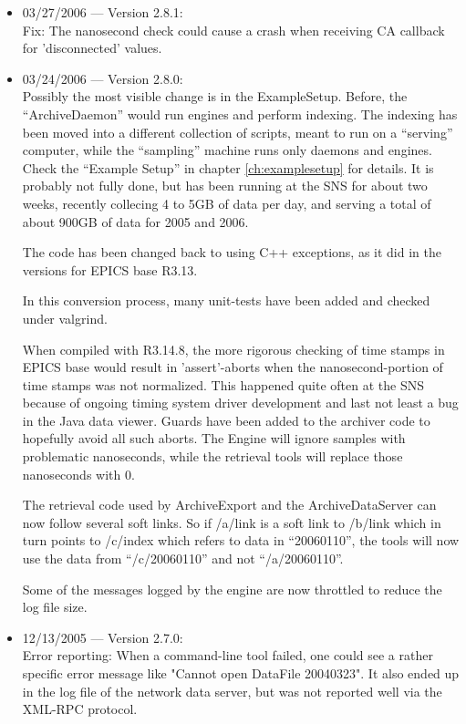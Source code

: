 \begin{itemize}
\item 03/27/2006 --- Version 2.8.1:\\
Fix: The nanosecond check could cause a crash when receiving
CA callback for 'disconnected' values.

\item 03/24/2006 --- Version 2.8.0:\\
Possibly the most visible change is in the ExampleSetup.
Before, the ``ArchiveDaemon'' would run engines and perform indexing.
The indexing has been moved into a different collection of scripts,
meant to run on a ``serving'' computer, while the ``sampling'' machine
runs only daemons and engines.
Check the ``Example Setup'' in chapter \ref{ch:examplesetup} for details.
It is probably not fully done, but has been running at the SNS for
about two weeks, recently collecing 4 to 5GB of data per day,
and serving a total of about 900GB of data for 2005 and 2006.

The code has been changed back to using C++ exceptions, as it did in
the versions for EPICS base R3.13.

In this conversion process, many unit-tests have been added
and checked under valgrind.

When compiled with R3.14.8, the more rigorous checking of time stamps
in EPICS base would result in 'assert'-aborts when the
nanosecond-portion of time stamps was not normalized.
This happened quite often at the SNS because of ongoing timing system driver
development and last not least a bug in the Java data viewer.
Guards have been added to the archiver code to hopefully avoid all
such aborts.
The Engine will ignore samples with problematic nanoseconds,
while the retrieval tools will replace those nanoseconds with 0.

The retrieval code used by ArchiveExport and the ArchiveDataServer can
now follow several soft links. So if /a/link is a soft link to /b/link
which in turn points to /c/index which refers to data in
``20060110'', the tools will now use the data from 
``/c/20060110'' and not ``/a/20060110''.

Some of the messages logged by the engine are now throttled
to reduce the log file size.

\item 12/13/2005 --- Version 2.7.0:\\
Error reporting: When a command-line tool failed,
one could see a rather specific error message
like "Cannot open DataFile 20040323".
It also ended up in the log file of the network
data server, but was not reported well via
the XML-RPC protocol.


\end{itemize}

